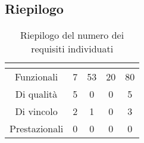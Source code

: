 \subsection{Riepilogo}
\renewcommand{\arraystretch}{1.5}
\begin{table}[H]
	\begin{center}
		\begin{tabular}{|c|c|c|c|c|}
			\hline
			\rowcolor{title_row}
			\textbf{\color{title_text}{Tipologia}}  & \textbf{\color{title_text}{0 Obbligatori}} & \textbf{\color{title_text}{1 Desiderabili}}& \textbf{\color{title_text}{2 Opzionali}} & \textbf{\color{title_text}{Totale}} \\ \hline
			Funzionali & 7 & 53 & 20 & 80\\ \hline
			Di qualità & 5 & 0 & 0 & 5\\ \hline
			Di vincolo & 2 & 1 & 0 & 3\\ \hline
			Prestazionali & 0 & 0 & 0 & 0 \\ \hline
		\end{tabular}
		\caption{Riepilogo del numero dei requisiti individuati\label{}}
	\end{center}
\end{table}
\renewcommand{\arraystretch}{1}




